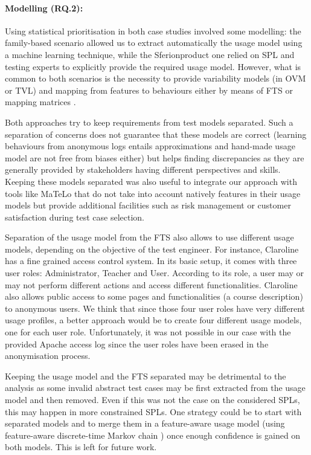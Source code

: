 \paragraph{Modelling (RQ.2):}

Using statistical prioritisation in both case studies involved some modelling: the family-based scenario allowed us to extract automatically the usage model using a machine learning technique, while the Sferion\texttrademark product one relied on SPL and testing experts to explicitly provide the required usage model. However, what is common to both scenarios is the necessity to provide variability models (in OVM or TVL)  and mapping from features to behaviours either by means of FTS or mapping matrices \cite{Samih2014b,Samih2014}. 

Both approaches try to keep requirements from test models separated. Such a separation of concerns does not guarantee that these models are correct (learning behaviours from anonymous logs entails approximations and hand-made usage model are not free from biases either)  but helps finding discrepancies as they are generally provided by stakeholders having different perspectives and skills. Keeping these models separated was also useful to integrate our approach with tools like MaTeLo that do not take into account natively features in their usage models but provide additional facilities such as risk management or customer satisfaction during test case selection.

Separation of the usage model from the FTS also allows to use different usage models, depending on the objective of the test engineer. For instance, Claroline has a fine grained access control system. In its basic setup, it comes with three user roles: Administrator, Teacher and User. According to its role, a user may or may not perform different actions and access different functionalities. Claroline also allows public access to some pages and functionalities (\eg a course description) to anonymous users. We think that since those four user roles have very different usage profiles, a better approach would be to create four different usage models, one for each user role. Unfortunately, it was not possible in our case with the provided Apache access log since the user roles have been erased in the anonymisation process.

Keeping the usage model and the FTS separated may be detrimental to the analysis as some invalid abstract test cases may be first extracted from the usage model and then removed. Even if this was not the case on the considered SPLs, this may happen in more constrained SPLs. One strategy could be to start with separated models and to merge them in a feature-aware usage model (\eg using feature-aware discrete-time Markov chain \cite{Rodrigues2015,terBeek2016}) once enough confidence is gained on both models. This is left for future work.

